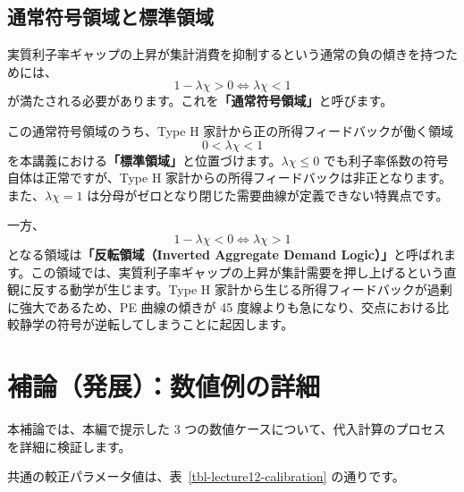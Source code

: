 \documentclass[
  japanese,
  lualatex,
  ja=standard,
  12pt,
  a4paper]{ltjsarticle}
\begin{document}

\subsection{通常符号領域と標準領域}\label{ux901aux5e38ux7b26ux53f7ux9818ux57dfux3068ux6a19ux6e96ux9818ux57df}

実質利子率ギャップの上昇が集計消費を抑制するという通常の負の傾きを持つためには、
\[
1 - \lambda\chi > 0 \iff \lambda\chi < 1
\]
が満たされる必要があります。これを\textbf{「通常符号領域」}と呼びます。

この通常符号領域のうち、Type H 家計から正の所得フィードバックが働く領域
\[
0 < \lambda\chi < 1
\]
を本講義における\textbf{「標準領域」}と位置づけます。\(\lambda\chi \leq 0\)
でも利子率係数の符号自体は正常ですが、Type H
家計からの所得フィードバックは非正となります。また、\(\lambda\chi = 1\)
は分母がゼロとなり閉じた需要曲線が定義できない特異点です。

一方、 \[
1 - \lambda\chi < 0 \iff \lambda\chi > 1
\] となる領域は\textbf{「反転領域（Inverted Aggregate Demand
Logic）」}と呼ばれます。この領域では、実質利子率ギャップの上昇が集計需要を押し上げるという直観に反する動学が生じます。Type
H 家計から生じる所得フィードバックが過剰に強大であるため、PE
曲線の傾きが 45
度線よりも急になり、交点における比較静学の符号が逆転してしまうことに起因します。


\section{補論（発展）：数値例の詳細}\label{ux88dcux8ad6ux767aux5c55ux6570ux5024ux4f8bux306eux8a73ux7d30}

本補論では、本編で提示した 3
つの数値ケースについて、代入計算のプロセスを詳細に検証します。

共通の較正パラメータ値は、表~\ref{tbl-lecture12-calibration}
の通りです。
\end{document}

